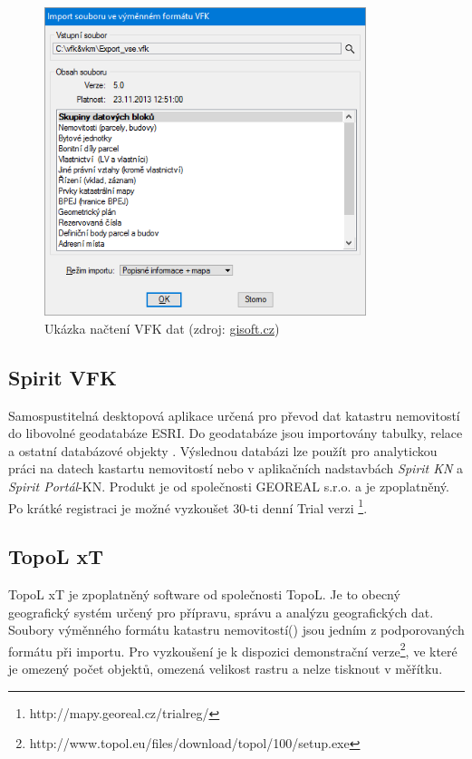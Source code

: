 \begin{figure}[H]
	 \centering
      \includegraphics[height=9cm]{./pictures/gisoft.png}
      \caption{Ukázka načtení VFK dat (zdroj:
\href{http://www.gisoft.cz/cze/files/Moduly/import-vfk.png}{gisoft.cz})}
      \label{fig:gisoft}
  \end{figure}
\subsection{Spirit VFK}
Samospustitelná desktopová aplikace určená pro převod dat katastru nemovitostí do libovolné geodatabáze ESRI. Do geodatabáze jsou importovány tabulky, relace a ostatní databázové objekty . Výslednou databázi lze použít pro analytickou práci na datech kastartu nemovitostí nebo v aplikačních nadstavbách \textit{Spirit KN} a \textit{Spirit Portál}-KN. Produkt je od společnosti GEOREAL s.r.o. a je zpoplatněný. Po krátké registraci je možné vyzkoušet 30-ti denní Trial verzi \footnote{http://mapy.georeal.cz/trialreg/}.\cite{spirit_vfk}
\subsection{TopoL xT}
TopoL xT je zpoplatněný software od společnosti TopoL. Je to obecný geografický systém určený pro přípravu, správu a analýzu geografických dat. Soubory výměnného formátu katastru nemovitostí() jsou jedním z podporovaných formátu při importu. Pro vyzkoušení je k dispozici demonstrační verze\footnote{http://www.topol.eu/files/download/topol/100/setup.exe}, ve které je omezený počet objektů, omezená velikost rastru a nelze tisknout v měřítku.\citep{topol}

